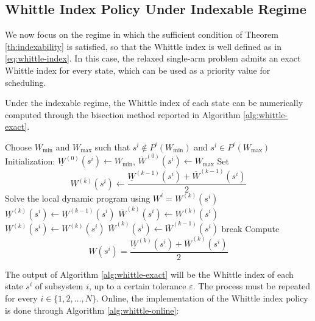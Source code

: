 \documentclass[letterpaper,journal]{IEEEtran}
\begin{document}
\subsection{Whittle Index Policy Under Indexable Regime}

We now focus on the regime in which the sufficient condition of Theorem \ref{th:indexability} is satisfied, so that the Whittle index is well defined as in \eqref{eq:whittle-index}. In this case, the relaxed single-arm problem admits an exact Whittle index for every state, which can be used as a priority value for scheduling.

Under the indexable regime, the Whittle index of each state can be numerically computed through the bisection method reported in Algorithm \ref{alg:whittle-exact}.

\begin{algorithm}[ht]
\caption{Whittle index computation}
\label{alg:whittle-exact}
\begin{algorithmic}[1]
		\State Choose $W_{\min}$ and $W_{\max}$ such that
		$s^i \notin P^i(W_{\min})$ and $s^i \in P^i(W_{\max})$
		\State Initialization:
		$\underline{W}^{(0)}(s^i) \leftarrow W_{\min}$,
		$\overline{W}^{(0)}(s^i) \leftarrow W_{\max}$
		\State Set
		\[
		W^{(k)}(s^i) \leftarrow
		\frac{\underline{W}^{(k-1)}(s^i)+\overline{W}^{(k-1)}(s^i)}{2}
		\]
		\State Solve the local dynamic program using
		$W^i = W^{(k)}(s^i)$
		\State $\underline{W}^{(k)}(s^i) \leftarrow \underline{W}^{(k-1)}(s^i)$
		\State $\overline{W}^{(k)}(s^i) \leftarrow W^{(k)}(s^i)$
		\Else
		\State $\underline{W}^{(k)}(s^i) \leftarrow W^{(k)}(s^i)$
		\State $\overline{W}^{(k)}(s^i) \leftarrow \overline{W}^{(k-1)}(s^i)$
		\EndIf
		\State break
		\EndIf
		\EndFor
		\State Compute
		\[
		W(s^i)=\frac{\underline{W}^{(k)}(s^i)+\overline{W}^{(k)}(s^i)}{2}
		\]
		\EndFor
\end{algorithmic}
\end{algorithm}
	
The output of Algorithm \ref{alg:whittle-exact} will be the Whittle index of each state $s^i$ of subsystem $i$, up to a certain tolerance $\varepsilon$. The process must be repeated for every $i\in\{1,2,\dots,N\}$. Online, the implementation of the Whittle index policy is done through Algorithm \ref{alg:whittle-online}:
\end{document}
